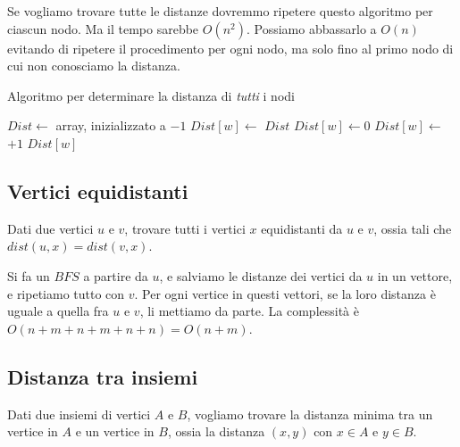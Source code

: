Se vogliamo trovare tutte le distanze dovremmo ripetere questo algoritmo per ciascun nodo. Ma il tempo sarebbe $O(n^2)$. Possiamo abbassarlo a $O(n)$ evitando di ripetere il procedimento per ogni nodo, ma solo fino al primo nodo di cui non conosciamo la distanza.

\begin{algorithm}
\caption{Algoritmo per determinare la distanza di \emph{tutti} i nodi}
\begin{algorithmic}[1]
    \State $Dist \gets$ array, inizializzato a $-1$
            \State $Dist[w] \gets$ 
        \EndIf
    \EndFor
    \State \Return $Dist$
\EndFunction
{}
            \State $Dist[w] \gets 0$
        \Else{}
            \State $Dist[w] \gets$  $+ 1$
        \EndIf
    \EndIf
    \State \Return $Dist[w]$
\EndFunction
\end{algorithmic}
\end{algorithm}

\clearpage

\subsection{Vertici equidistanti}

\begin{esercizio}
Dati due vertici $u$ e $v$, trovare tutti i vertici $x$ equidistanti da $u$ e $v$, ossia tali che $dist(u,x) = dist(v,x)$.
\end{esercizio}

Si fa un $BFS$ a partire da $u$, e salviamo le distanze dei vertici da $u$ in un vettore, e ripetiamo tutto con $v$. Per ogni vertice in questi vettori, se la loro distanza \`e uguale a quella fra $u$ e $v$, li mettiamo da parte. La complessit\`a \`e $O(n+m+n+m+n+n) = O(n+m)$.

\clearpage

\subsection{Distanza tra insiemi}

\begin{esercizio}
Dati due insiemi di vertici $A$ e $B$, vogliamo trovare la distanza minima tra un vertice in $A$ e un vertice in $B$, ossia la distanza $(x,y)$ con $x \in A$ e $y \in B$.
\end{esercizio}


